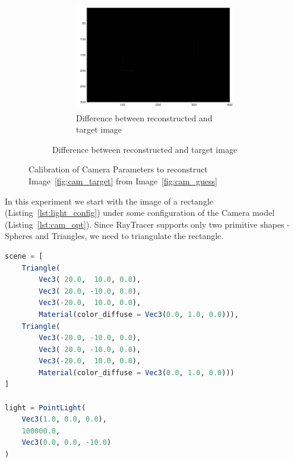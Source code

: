 \documentclass{juliacon}
\begin{document}
\begin{figure}[!htb]
\begin{subfigure}[c]{0.45\textwidth}
\begin{subfigure}[c]{0.45\textwidth}
            \centering
            \includegraphics[width=\textwidth]{images/camera/diff.png}
            \caption{Difference between reconstructed and target image}
        \end{subfigure}
    \end{subfigure}
    \caption{Calibration of Camera Parameters to reconstruct Image~\ref{fig:cam_target} from Image~\ref{fig:cam_guess}}
    \label{fig:cam_invrender}
\end{figure}

In this experiment we start with the image of a rectangle (Listing~\ref{lst:light_config}) under some configuration of the Camera model (Listing~\ref{lst:cam_opt}). Since RayTracer supports only two primitive shapes - Spheres and Triangles, we need to triangulate the rectangle.

\begin{lstlisting}[caption = {Configuration of the Scene for Experiment~\ref{sec:calcam}},
                   label = {lst:light_config},
                   captionpos = b,
                   language = Julia]
scene = [
    Triangle(
        Vec3( 20.0,  10.0, 0.0),
        Vec3( 20.0, -10.0, 0.0),
        Vec3(-20.0,  10.0, 0.0),
        Material(color_diffuse = Vec3(0.0, 1.0, 0.0))),
    Triangle(
        Vec3(-20.0, -10.0, 0.0),
        Vec3( 20.0, -10.0, 0.0),
        Vec3(-20.0,  10.0, 0.0),
        Material(color_diffuse = Vec3(0.0, 1.0, 0.0)))
]

light = PointLight(
    Vec3(1.0, 0.0, 0.0),
    100000.0,
    Vec3(0.0, 0.0, -10.0)
)
\end{lstlisting}
\end{document}
